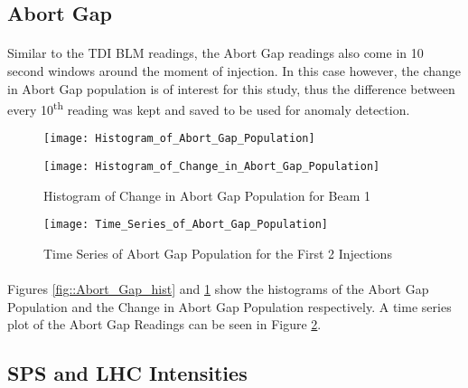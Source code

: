 \subsection{Abort Gap}
\paragraph{ }Similar to the \acs{TDI} \acs{BLM} readings, the Abort Gap readings also come in 10 second windows around the moment of injection. In this case however, the change in Abort Gap population is of interest for this study, thus the difference between every 10\textsuperscript{th} reading was kept and saved to be used for anomaly detection.

\begin{figure}[!t]
	\begin{minipage}[b]{0.475\linewidth}
		\centering
		\texttt{[image: Histogram\_of\_Abort\_Gap\_Population]}
		\caption[Abort Gap Histogram]{Histogram of Abort Gap Population for Beam 1}
		\label{fig::Abort_Gap_hist}
	\end{minipage}	
	\hspace{0.25cm}
	\begin{minipage}[b]{0.475\linewidth}
		\centering
		\texttt{[image: Histogram\_of\_Change\_in\_Abort\_Gap\_Population]}
		\caption[Change in Abort Gap Histogram]{Histogram of Change in Abort Gap Population for Beam 1}
		\label{fig::Change_in_Abort_Gap_hist}
	\end{minipage}	
\end{figure}

\begin{figure}[b]
	\centering
	\texttt{[image: Time\_Series\_of\_Abort\_Gap\_Population]}
	\caption[Abort Gap Time Series]{Time Series of Abort Gap  Population for the First 2 Injections}
	\label{fig::Abort_Gap_Time_Series}
\end{figure}  


\paragraph{ }Figures \ref{fig::Abort_Gap_hist} and \ref{fig::Change_in_Abort_Gap_hist} show the histograms of the Abort Gap Population and the Change in Abort Gap Population respectively. A time series plot of the Abort Gap Readings can be seen in Figure \ref{fig::Abort_Gap_Time_Series}.

\subsection{\acs{SPS} and \acs{LHC} Intensities}
